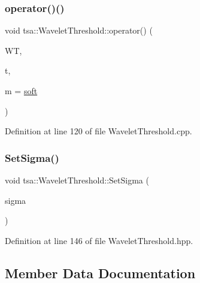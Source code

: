 \subsubsection{\texorpdfstring{operator()()}{operator()()}\hspace{0.1cm}{\footnotesize\ttfamily [2/2]}}
{\footnotesize\ttfamily void tsa\+::\+Wavelet\+Threshold\+::operator() (\begin{DoxyParamCaption}\item[{\hyperlink{namespacetsa_ad260cd21c1891c4ed391fe788569aba4}{Dmatrix} \&}]{WT,  }\item[{enum \hyperlink{classtsa_1_1_wavelet_threshold_a50c42c95dae960986a985157ca038fae}{Wavelet\+Thresholding}}]{t,  }\item[{enum \hyperlink{classtsa_1_1_wavelet_threshold_a93d14df024bbc8c3da182bf5899f8f83}{Thresholding\+Mode}}]{m = {\ttfamily \hyperlink{classtsa_1_1_wavelet_threshold_a93d14df024bbc8c3da182bf5899f8f83a356244854a142af0e9f3db2cf4ad5192}{soft}} }\end{DoxyParamCaption})}



Definition at line 120 of file Wavelet\+Threshold.\+cpp.

\mbox{\label{classtsa_1_1_wavelet_threshold_a828cc5dbb8c68647a28f72eb0945e2a4}} 
\subsubsection{\texorpdfstring{Set\+Sigma()}{SetSigma()}}
{\footnotesize\ttfamily void tsa\+::\+Wavelet\+Threshold\+::\+Set\+Sigma (\begin{DoxyParamCaption}\item[{double}]{sigma }\end{DoxyParamCaption})\hspace{0.3cm}{\ttfamily [inline]}}



Definition at line 146 of file Wavelet\+Threshold.\+hpp.



\subsection{Member Data Documentation}
\mbox{\label{classtsa_1_1_wavelet_threshold_a033b585f29f5e95f7e525e993569e781}} 

